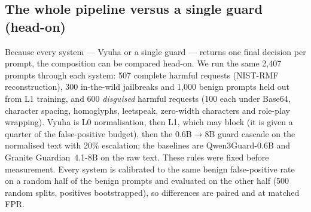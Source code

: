 \documentclass[11pt]{article}
\begin{document}
\subsection{The whole pipeline versus a single guard (head-on)}
Because every system --- Vyuha or a single guard --- returns one final decision per prompt, the
composition can be compared head-on. We run the same 2,407 prompts through each system: 507 complete
harmful requests (NIST-RMF reconstruction), 300 in-the-wild jailbreaks and 1,000 benign prompts held out
from L1 training, and 600 \emph{disguised} harmful requests (100 each under Base64, character spacing,
homoglyphs, leetspeak, zero-width characters and role-play wrapping). Vyuha is L0 normalisation, then L1,
which may block (it is given a quarter of the false-positive budget), then the 0.6B$\rightarrow$8B guard
cascade on the normalised text with 20\% escalation; the baselines are Qwen3Guard-0.6B and Granite
Guardian~4.1-8B on the raw text. These rules were fixed before measurement. Every system is calibrated to
the same benign false-positive rate on a random half of the benign prompts and evaluated on the other half
(500 random splits, positives bootstrapped), so differences are paired and at matched FPR.

\begin{table}[t]
\centering\footnotesize\setlength{\tabcolsep}{4pt}
\caption{Head-on, end-to-end comparison at matched benign FPR (held-out FPR 5.3--5.4\% and 2.1--2.2\%
for every system). Vyuha's mean latency is 203\,ms per request vs 595\,ms for Granite~4.1 on one T4
(95\% benign / 5\% attack traffic). Bold: significant difference from Granite~4.1 alone (paired, 500
splits). Disguised = six obfuscation tricks; Granite~4.1 alone catches 0.01 of Base64-encoded requests,
Vyuha 1.00.}
\label{tab:e2e}
\end{table}
\end{document}
